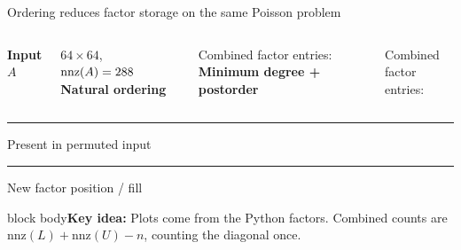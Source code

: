 \documentclass[aspectratio=169,10pt]{beamer}
\newcommand{\takeaway}[1]{\vfill\begin{beamercolorbox}[sep=7pt,wd=\textwidth]{block body}\small\textbf{Key idea:} #1\end{beamercolorbox}}
\begin{document}
\begin{frame}{Ordering reduces factor storage on the same Poisson problem}
\begin{columns}[c,onlytextwidth]
\centering
\textbf{Input $A$}\par\vspace{.1cm}
\par\small $64\times64$, $\mathrm{nnz}(A)=288$
\centering
\textbf{Natural ordering}\par\vspace{.1cm}
\par\small Combined factor entries: \NaturalCombinedNNZ
{}\centering
\textbf{Minimum degree + postorder}\par\vspace{.1cm}
\par\small Combined factor entries: \OrderedCombinedNNZ
\end{columns}
\vspace{.3cm}\centering\small
\textcolor{Teal}{\rule{.2cm}{.2cm}} Present in permuted input\qquad
\textcolor{Amber}{\rule{.2cm}{.2cm}} New factor position / fill
\takeaway{Plots come from the Python factors. Combined counts are $\mathrm{nnz}(L)+\mathrm{nnz}(U)-n$, counting the diagonal once.}
\end{frame}
\end{document}
